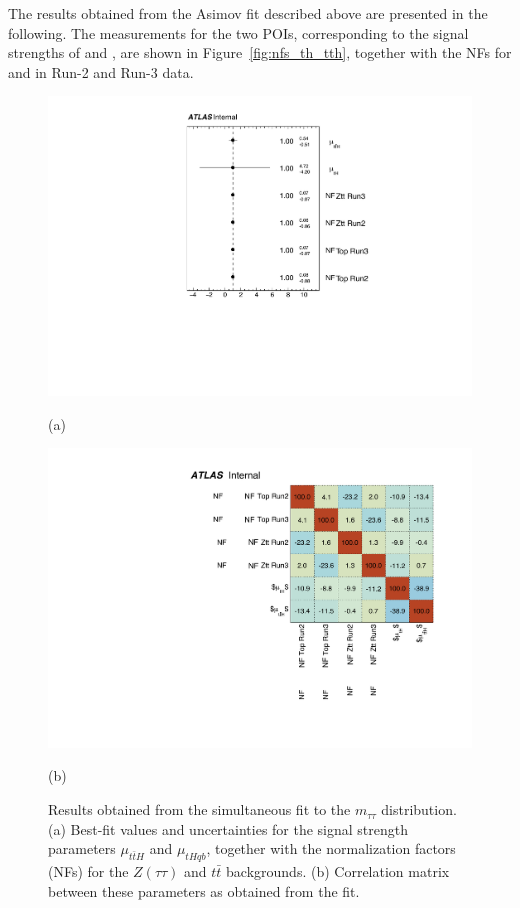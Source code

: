 The results obtained from the Asimov fit described above are presented in the following. The measurements for the two POIs, corresponding to the signal strengths of \thqb and \ttH, are shown in Figure~\ref{fig:nfs_th_tth}, together with the NFs for \ztautau and \ttbar in Run-2 and Run-3 data.
\begin{figure}[htbp]
  \centering
  \begin{minipage}[t]{0.495\textwidth}
    \centering
    \vspace{0pt}
    \includegraphics[width=\linewidth]{images/asimov_fit_th_tth/NormFactors.pdf}
    \caption*{(a)}
  \end{minipage}%
  \hfill
  \begin{minipage}[t]{0.495\textwidth}
    \centering
    \vspace{0pt}
    \includegraphics[width=\linewidth]{images/asimov_fit_th_tth/CorrMatrix.pdf}
    \caption*{(b)}
  \end{minipage}

  \caption{Results obtained from the simultaneous fit to the $m_{\tau\tau}$ distribution. 
  (a) Best-fit values and uncertainties for the signal strength parameters $\mu_{t\bar{t}H}$ and $\mu_{tHqb}$, 
  together with the normalization factors (NFs) for the $Z(\tau\tau)$ and $t\bar{t}$ backgrounds. 
  (b) Correlation matrix between these parameters as obtained from the fit.}
  \label{fig:mu_nf_results_mtautau}
\end{figure}

